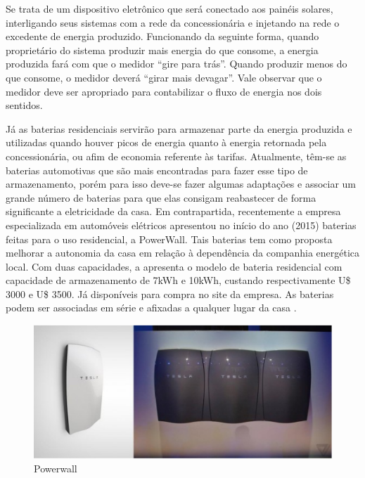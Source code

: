 	Se trata de um dispositivo eletrônico que será conectado aos painéis solares, interligando seus sistemas com a rede da concessionária e injetando na rede o excedente de energia produzido. Funcionando da seguinte forma, quando proprietário do sistema produzir mais energia do que consome, a energia produzida fará com que o medidor “gire para trás”. Quando produzir menos do que consome, o medidor deverá “girar mais devagar”. Vale observar que o medidor deve ser apropriado para contabilizar o fluxo de energia nos dois sentidos.

	Já as baterias residenciais servirão para armazenar parte da energia produzida e utilizadas quando houver picos de energia quanto à energia retornada pela concessionária, ou afim de economia referente às tarifas. Atualmente, têm-se as baterias automotivas que são mais encontradas para fazer esse tipo de armazenamento, porém para isso deve-se fazer algumas adaptações e associar um grande número de baterias para que elas consigam reabastecer de forma significante a eletricidade da casa. Em contrapartida, recentemente a empresa especializada em automóveis elétricos \cite{TESLA} apresentou no início do ano (2015) baterias feitas para o uso residencial, a PowerWall. Tais baterias tem como proposta melhorar a autonomia da casa em relação à dependência da companhia energética local. Com duas capacidades, a \cite{TESLA} apresenta o modelo de bateria residencial com capacidade de armazenamento de 7kWh e 10kWh, custando respectivamente U\$ 3000 e U\$ 3500. Já disponíveis para compra no site da empresa. As baterias podem ser associadas em série e afixadas a qualquer lugar da casa \cite{TESLA}.

\begin{figure}[H]
  \begin{center}
	\includegraphics[keepaspectratio,scale=1]{figuras/powerwall.eps}
	\caption{Powerwall}
  \end{center}
\end{figure}


